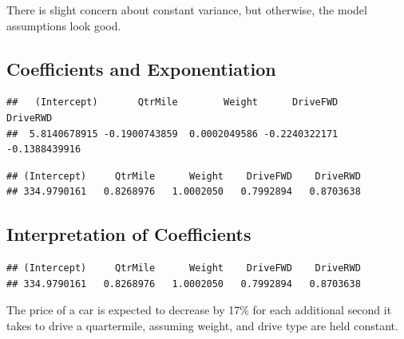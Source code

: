 \documentclass[]{book}
\newenvironment{Shaded}{\begin{snugshade}}{\end{snugshade}}
\newcommand{\KeywordTok}[1]{\textcolor[rgb]{0.13,0.29,0.53}{\textbf{#1}}}
\newcommand{\OperatorTok}[1]{\textcolor[rgb]{0.81,0.36,0.00}{\textbf{#1}}}
\newcommand{\NormalTok}[1]{#1}
\begin{document}
There is slight concern about constant variance, but otherwise, the
model assumptions look good.

\subsection{Coefficients and
Exponentiation}\label{coefficients-and-exponentiation}

\begin{Shaded}
\end{Shaded}

\begin{verbatim}
##   (Intercept)       QtrMile        Weight      DriveFWD      DriveRWD 
##  5.8140678915 -0.1900743859  0.0002049586 -0.2240322171 -0.1388439916
\end{verbatim}

\begin{Shaded}
\end{Shaded}

\begin{verbatim}
## (Intercept)     QtrMile      Weight    DriveFWD    DriveRWD 
## 334.9790161   0.8268976   1.0002050   0.7992894   0.8703638
\end{verbatim}

\subsection{Interpretation of
Coefficients}\label{interpretation-of-coefficients}

\begin{Shaded}
\end{Shaded}

\begin{verbatim}
## (Intercept)     QtrMile      Weight    DriveFWD    DriveRWD 
## 334.9790161   0.8268976   1.0002050   0.7992894   0.8703638
\end{verbatim}

The price of a car is expected to decrease by 17\% for each additional
second it takes to drive a quartermile, assuming weight, and drive type
are held constant.
\end{document}
